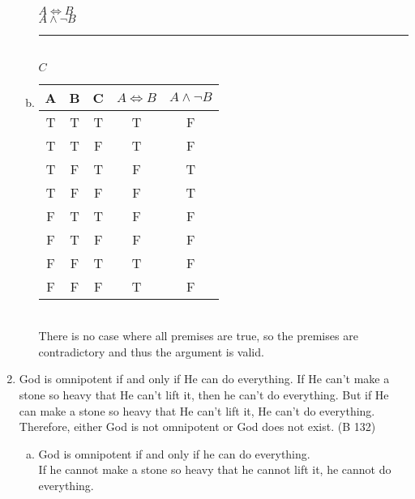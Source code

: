 \documentclass{article}
\begin{document}
\begin{enumerate}
\begin{enumerate}[(a)]
                        $A \iff B$\\
                        $A \land \neg B$\\
                        \rule{5em}{.5pt}\\
                        $C$
                  \item \begin{tabular}{c|c|c|c|c}
                              A                      & B & C & $A \iff B$ & $A \land \neg B$ \\
                              \hline
                              \rowcolor{lightgray} T & T & T & T          & F                \\
                              \rowcolor{lightgray} T & T & F & T          & F                \\
                              \rowcolor{lightgray} T & F & T & F          & T                \\
                              \rowcolor{lightgray} T & F & F & F          & T                \\
                              \rowcolor{lightgray} F & T & T & F          & F                \\
                              \rowcolor{lightgray} F & T & F & F          & F                \\
                              \rowcolor{lightgray} F & F & T & T          & F                \\
                              \rowcolor{lightgray} F & F & F & T          & F                \\
                        \end{tabular}\\
                        There is no case where all premises are true, so the premises are contradictory and thus the argument is valid.
            \end{enumerate}
      \item God is omnipotent if and only if He can do everything. If He can't make a stone so heavy that He can't lift it, then he can't do everything. But if He can make a stone so heavy that He can't lift it, He can't do everything. Therefore, either God is not omnipotent or God does not exist. (B 132)
            \begin{enumerate}[(a)]
                  \item God is omnipotent if and only if he can do everything.\\
                        If he cannot make a stone so heavy that he cannot lift it, he cannot do everything.\\

\end{enumerate}
\end{enumerate}
\end{document}
